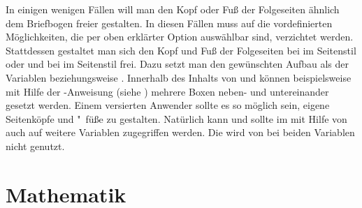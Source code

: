 \begin{Declaration}
\end{Declaration}
In einigen wenigen Fällen will man den Kopf oder Fuß der Folgeseiten ähnlich
dem Briefbogen freier gestalten. In diesen Fällen muss auf
die vordefinierten Möglichkeiten, die per oben erklärter Option
 auswählbar
sind, verzichtet werden. Stattdessen gestaltet man sich den Kopf und Fuß der
Folgeseiten bei  im Seitenstil
%
 oder
 und bei
 im Seitenstil
%
frei. Dazu setzt man den gewünschten Aufbau als  der
Variablen 
beziehungsweise . Innerhalb des Inhalts von
 und  können beispielsweise mit Hilfe
der -Anweisung (siehe \cite{latex:usrguide}) mehrere Boxen
neben- und untereinander gesetzt werden.  Einem versierten Anwender sollte es
so möglich sein, eigene Seitenköpfe und "~füße zu gestalten. Natürlich kann
und sollte im  mit Hilfe von 
auch auf weitere Variablen zugegriffen werden. Die  wird
von \KOMAScript{} bei beiden Variablen nicht genutzt.%
\EndIndexGroup \EndIndexGroup
%
\EndIndexGroup






\section{Mathematik}
%
\BeginIndexGroup
{}%
%
%

